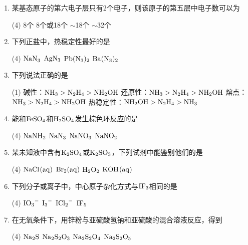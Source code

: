 \begin{enumerate}[label=\arabic*., itemsep=1.5ex]
    \item 某基态原子的第六电子层只有2个电子，则该原子的第五层中电子数可以为
    \begin{tasks}(4)
        \task 8个
        \task 8个或18个
        $\sim$18个
        $\sim$32个
    \end{tasks}

    \item 下列正盐中，热稳定性最好的是
    \begin{tasks}(4)
        \task $\ce{NaN3}$
        \task $\ce{AgN3}$
        \task $\ce{Pb(N3)2}$
        \task $\ce{Ba(N3)2}$
    \end{tasks}

    \item 下列说法正确的是
    \begin{tasks}(1)
        \task 碱性：$\ce{NH3}>\ce{N2H4}>\ce{NH2OH}$
        \task 还原性：$\ce{NH3}>\ce{N2H4}>\ce{NH2OH}$
        \task 熔点：$\ce{NH3}>\ce{N2H4}>\ce{NH2OH}$
        \task 热稳定性：$\ce{NH2OH}>\ce{N2H4}>\ce{NH3}$
    \end{tasks}

    \item 能和$\ce{FeSO4}$和$\ce{H2SO4}$发生棕色环反应的是
    \begin{tasks}(4)
        \task $\ce{NaNH2}$
        \task $\ce{NaN3}$
        \task $\ce{NaNO3}$
        \task $\ce{NaNO2}$
    \end{tasks}

    \item 某未知液中含有$\ce{K2SO4}$或$\ce{K2SO3}$，下列试剂中能鉴别他们的是
    \begin{tasks}(4)
        \task $\ce{NaCl(aq)}$
        \task $\ce{Br2(aq)}$
        \task $\ce{H2O2}$
        \task $\ce{KOH(aq)}$
    \end{tasks}

    \item 下列分子或离子中，中心原子杂化方式与$\ce{IF3}$相同的是
    \begin{tasks}(4)
        \task $\ce{IO3-}$
        \task $\ce{I3-}$
        \task $\ce{ICl2-}$
        \task $\ce{IF5}$
    \end{tasks}

    \item 在无氧条件下，用锌粉与亚硫酸氢钠和亚硫酸的混合溶液反应，得到
    \begin{tasks}(4)
        \task $\ce{Na2S}$
        \task $\ce{Na2S2O3}$
        \task $\ce{Na2S2O4}$
        \task $\ce{Na2S2O5}$
    \end{tasks}


\end{enumerate}
